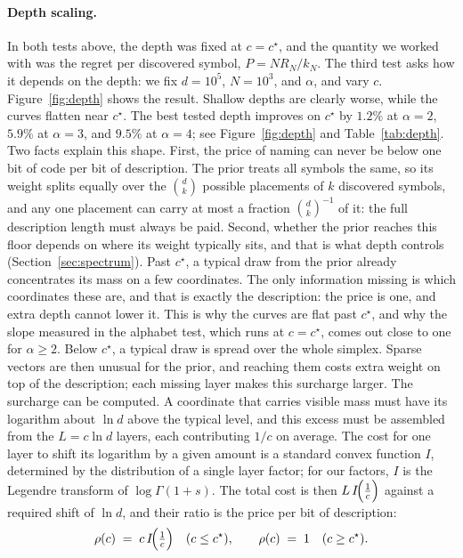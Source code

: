 \documentclass[11pt]{article}
\newcommand{\cstar}{c^{\star}}
\newcommand{\price}{\rho}            %
\newcommand{\rate}{I}                %
\begin{document}
\paragraph{Depth scaling.}
In both tests above, the depth was fixed at $c = \cstar$, and the quantity we worked with was the regret per discovered symbol,
$P = N R_N / k_N$. The third test asks how it depends on the depth: we fix $d = 10^{5}$,
$N = 10^{3}$, and $\alpha$, and vary $c$. Figure~\ref{fig:depth}
shows the result. Shallow depths are clearly worse, while the curves flatten near
\(\cstar\). The best tested depth improves on \(\cstar\) by \(1.2\%\) at
\(\alpha=2\), \(5.9\%\) at \(\alpha=3\), and \(9.5\%\) at \(\alpha=4\);
see Figure~\ref{fig:depth} and Table~\ref{tab:depth}.
Two facts explain this shape. First, the price of naming can never
be below one bit of code per bit of description. The prior treats
all symbols the same, so its weight splits equally over the
$\binom{d}{k}$ possible placements of $k$ discovered symbols, and
any one placement can carry at most a fraction
$\binom{d}{k}^{-1}$ of it: the full description length must always
be paid. Second, whether the prior reaches this floor depends on
where its weight typically sits, and that is what depth controls
(Section~\ref{sec:spectrum}). Past $\cstar$, a typical draw from the prior already
concentrates its mass on a few coordinates. The only information
missing is which coordinates these are, and that is exactly the
description: the price is one, and extra depth cannot lower it.
This is why the curves are flat past $\cstar$, and why the slope
measured in the alphabet test, which runs at $c = \cstar$, comes
out close to one for $\alpha \ge 2$. Below $\cstar$, a typical draw is spread over the whole
simplex. Sparse vectors are then unusual for the prior, and
reaching them costs extra weight on top of the description; each
missing layer makes this surcharge larger.
The surcharge can be computed. A coordinate that carries visible
mass must have its logarithm about $\ln d$ above the typical
level, and this excess must be assembled from the $L = c \ln d$
layers, each contributing $1/c$ on average. The cost for one layer
to shift its logarithm by a given amount is a standard convex
function $\rate$, determined by the distribution of a single
layer factor; for our factors, $\rate$ is the Legendre
transform of $\log\Gamma(1+s)$. The total cost is then $L\,\rate\!\Bigl(\tfrac1c\Bigr)$
against a required shift of $\ln d$, and their ratio is the price
per bit of description:
\begin{equation}
\price(c) \;=\; c\,\rate\!\Bigl(\tfrac1c\Bigr) \quad (c \le \cstar),
\qquad
\price(c) \;=\; 1 \quad (c \ge \cstar).
\label{eq:Ac}
\end{equation}
\end{document}

